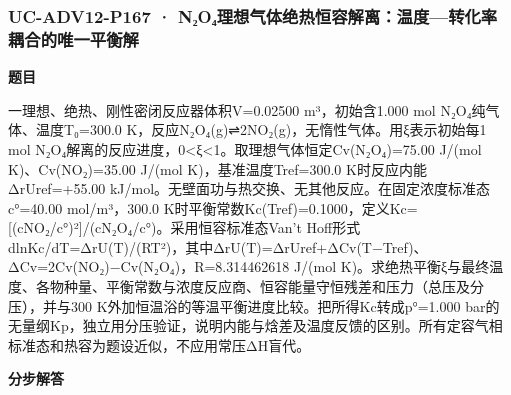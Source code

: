 \documentclass[UTF8,11pt,a4paper]{ctexart}
\begin{document}
\subsubsection*{UC-ADV12-P167 · N₂O₄理想气体绝热恒容解离：温度—转化率耦合的唯一平衡解}
\noindent\textbf{题目}\par
一理想、绝热、刚性密闭反应器体积V=0.02500 m³，初始含1.000 mol N₂O₄纯气体、温度T₀=300.0 K，反应N₂O₄(g)⇌2NO₂(g)，无惰性气体。用ξ表示初始每1 mol N₂O₄解离的反应进度，0<ξ<1。取理想气体恒定Cv(N₂O₄)=75.00 J/(mol K)、Cv(NO₂)=35.00 J/(mol K)，基准温度Tref=300.0 K时反应内能ΔrUref=+55.00 kJ/mol。无壁面功与热交换、无其他反应。在固定浓度标准态c°=40.00 mol/m³，300.0 K时平衡常数Kc(Tref)=0.1000，定义Kc=[(cNO₂/c°)²]/(cN₂O₄/c°)。采用恒容标准态Van’t Hoff形式dlnKc/dT=ΔrU(T)/(RT²)，其中ΔrU(T)=ΔrUref+ΔCv(T−Tref)、ΔCv=2Cv(NO₂)−Cv(N₂O₄)，R=8.314462618 J/(mol K)。求绝热平衡ξ与最终温度、各物种量、平衡常数与浓度反应商、恒容能量守恒残差和压力（总压及分压），并与300 K外加恒温浴的等温平衡进度比较。把所得Kc转成p°=1.000 bar的无量纲Kp，独立用分压验证，说明内能与焓差及温度反馈的区别。所有定容气相标准态和热容为题设近似，不应用常压ΔH盲代。\par
\medskip\noindent\textbf{分步解答}
\end{document}
